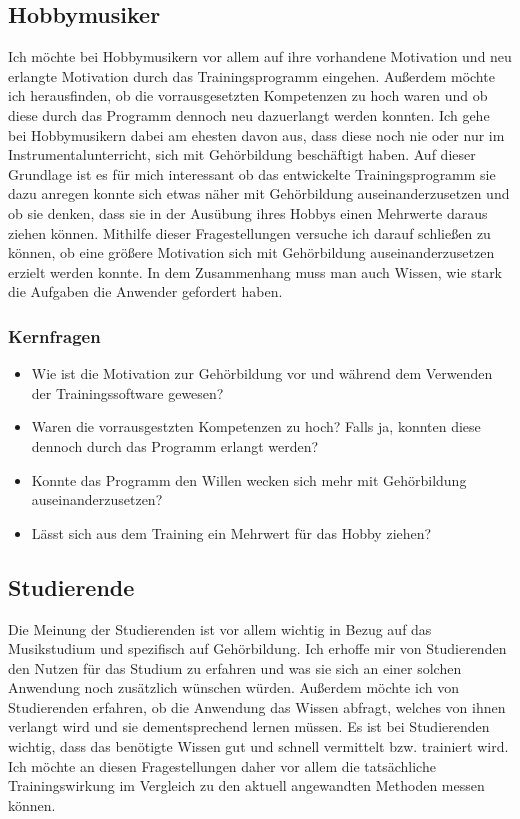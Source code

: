 \subsection{Hobbymusiker}
Ich möchte bei Hobbymusikern vor allem auf ihre vorhandene Motivation und neu erlangte Motivation durch das Trainingsprogramm eingehen. Außerdem möchte ich herausfinden, ob die vorrausgesetzten Kompetenzen zu hoch waren und ob diese durch das Programm dennoch neu dazuerlangt werden konnten. Ich gehe bei Hobbymusikern dabei am ehesten davon aus, dass diese noch nie oder nur im Instrumentalunterricht, sich mit Gehörbildung beschäftigt haben. Auf dieser Grundlage ist es für mich interessant ob das entwickelte Trainingsprogramm sie dazu anregen konnte sich etwas näher mit Gehörbildung auseinanderzusetzen und ob sie denken, dass sie in der Ausübung ihres Hobbys einen Mehrwerte daraus ziehen können. Mithilfe dieser Fragestellungen versuche ich darauf schließen zu können, ob eine größere Motivation sich mit Gehörbildung auseinanderzusetzen erzielt werden konnte. In dem Zusammenhang muss man auch Wissen, wie stark die Aufgaben die Anwender gefordert haben.
\subsubsection*{Kernfragen}
\begin{itemize}
    \item Wie ist die Motivation zur Gehörbildung vor und während dem Verwenden der Trainingssoftware gewesen?
    \item Waren die vorrausgestzten Kompetenzen zu hoch? Falls ja, konnten diese dennoch durch das Programm erlangt werden?
    \item Konnte das Programm den Willen wecken sich mehr mit Gehörbildung auseinanderzusetzen?
    \item Lässt sich aus dem Training ein Mehrwert für das Hobby ziehen?
\end{itemize}
 
\subsection{Studierende}
Die Meinung der Studierenden ist vor allem wichtig in Bezug auf das Musikstudium und spezifisch auf Gehörbildung. Ich erhoffe mir von Studierenden den Nutzen für das Studium zu erfahren und was sie sich an einer solchen Anwendung noch zusätzlich wünschen würden. Außerdem möchte ich von Studierenden erfahren, ob die Anwendung das Wissen abfragt, welches von ihnen verlangt wird und sie dementsprechend lernen müssen. Es ist bei Studierenden wichtig, dass das benötigte Wissen gut und schnell vermittelt bzw. trainiert wird. Ich möchte an diesen Fragestellungen daher vor allem die tatsächliche Trainingswirkung im Vergleich zu den aktuell angewandten Methoden messen können.
